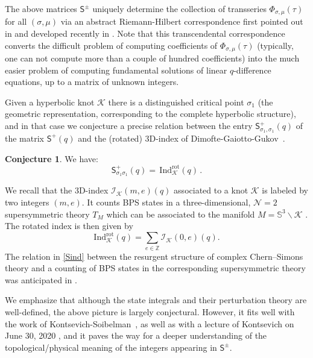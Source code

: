 \documentclass[12pt,reqno]{amsart}
\theoremstyle{definition}
\newtheorem{conjecture}[theorem]{Conjecture}
\def\CK{\mathcal K}
\def\CI{\mathcal I}
\def\IZ{\mathbb{Z}}
\def\s{\sigma}
\def\Ind{\mathrm{Ind}}
\def\Ind{\mathrm{Ind}}
\def\rot{\mathrm{rot}}
\def\ms{\mathsf}
\begin{document}
The above matrices $\mathsf{S}^{\pm}$ uniquely determine the collection of
transseries $\Phi_{\s,\mu}(\tau)$ for all $(\s,\mu)$ via an abstract
Riemann-Hilbert correspondence first pointed out in \cite{voros} and
developed recently in \cite{gmn,ims,ks-ar}. Note that this
transcendental correspondence converts the difficult problem of
computing coefficients of $\Phi_{\s,\mu}(\tau)$ (typically, one can
not compute more than a couple of hundred coefficients) into the much
easier problem of computing fundamental solutions of linear
$q$-difference equations, up to a matrix of unknown integers.

Given a hyperbolic knot $\CK$ there is a distinguished critical point
$\s_1$ (the geometric representation, corresponding to the complete
hyperbolic structure), and in that case we conjecture a precise
relation between the entry $\mathsf{S}^+_{\s_1,\s_1}(q)$ of the matrix
$\ms{S}^+(q)$ and the (rotated) 3D-index of
Dimofte-Gaiotto-Gukov~\cite{DGG1,DGG2}.

\begin{conjecture}
  \label{conj.2}
  We have:
  \begin{equation}
    \label{Sind}
    \mathsf{S}^+_{\s_1\s_1}(q) =  \,\Ind_\CK^\rot(q)\,.
  \end{equation}
\end{conjecture}

We recall that the 3D-index $\CI_\CK (m,e)(q)$ associated to a knot
$\CK$ is labeled by two integers $(m,e)$. It counts BPS states in a
three-dimensional, $\mathcal{N}=2$ supersymmetric theory $T_M$ which
can be associated to the manifold $M=\mathbb{S}^3\backslash \CK$
\cite{DGG1}.  The rotated index is then given by
%
\begin{equation}
  \Ind_\CK^\rot(q)=\sum_{e \in \IZ} \CI_\CK (0,e)(q). 
\end{equation}
%
The relation in \eqref{Sind} between the resurgent structure of
complex Chern--Simons theory and a counting of BPS states in the
corresponding supersymmetric theory was anticipated in
\cite{mm-s2019,ggm}.

We emphasize that although the state integrals and their perturbation
theory are well-defined, the above picture is largely conjectural.
However, it fits well with the work of Kontsevich-Soibelman~\cite{KS},
as well as with a lecture of Kontsevich on June 30, 2020
\cite{kontsevich-talk}, and it paves the way for a deeper
understanding of the topological/physical meaning of the integers
appearing in $\mathsf{S}^{\pm}$.
\end{document}
